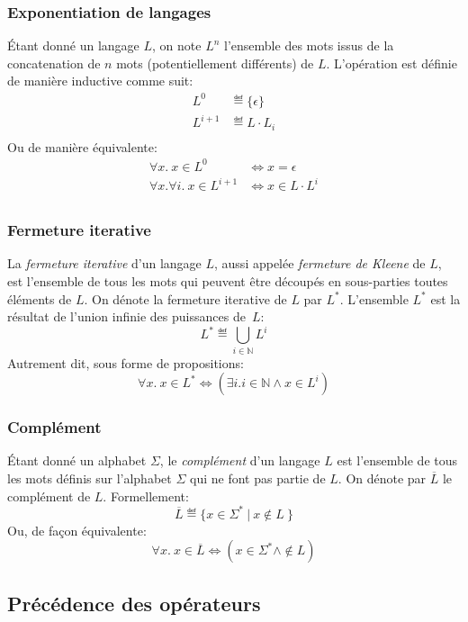 \subsubsection{Exponentiation de langages}

Étant donné un langage $L$, on note $L^n$ l'ensemble des mots issus de la concatenation de $n$ mots (potentiellement différents) de $L$.
L'opération est définie de manière inductive comme suit:
\begin{align*}
L^0 &\eqdef \{ \epsilon \}\\
L^{i + 1} &\eqdef L \cdot L_i\\
\end{align*}
Ou de manière équivalente:
\begin{align*}
\forall x.\ x \in L^0 &\iff x = \epsilon\\
\forall x. \forall i.\ x \in L^{i + 1} &\iff x \in L \cdot L^i\\
\end{align*}

\subsubsection{Fermeture iterative}

La \og \textit{fermeture iterative} \fg{} d'un langage $L$, aussi appelée \og \textit{fermeture de Kleene} \fg{} de $L$, est l'ensemble de tous les mots qui peuvent être découpés en sous-parties toutes éléments de $L$. On dénote la fermeture iterative de $L$ par $L^*$.
L'ensemble $L^*$ est la résultat de l'union infinie des puissances de~$L$:
\[
L^* \eqdef \bigcup_{i \in \mathbb{N}} L^i
\]
Autrement dit, sous forme de propositions:
\[
\forall x.\ x \in L^* \iff (\exists i. i \in \mathbb{N} \wedge x \in L^i)
\]

\subsubsection{Complément}

Étant donné un alphabet $\Sigma$, le \og \textit{complément} \fg{} d'un langage $L$ est l'ensemble de tous les mots définis sur l'alphabet $\Sigma$ qui ne font pas partie de $L$. On dénote par $\overline{L}$ le complément de $L$.
Formellement:
\[
\overline{L} \eqdef \{ x \in \Sigma^*\ |\ x \not\in L\ \}
\]
Ou, de façon équivalente:
\[
\forall x. \ x \in \overline{L} \iff (x \in \Sigma^* \wedge \not\in L)
\]

\subsection{Précédence des opérateurs}

